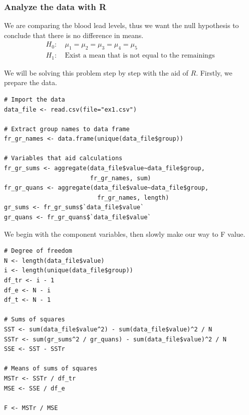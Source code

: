 \documentclass[a4paper]{article}
\numberwithin{equation}{section}
\begin{document}
\subsubsection{Analyze the data with R}
We are comparing the blood lead levels, thus we want the null hypothesis to conclude that there is no difference in means.
\begin{align*}
  H_0: & \ \mu_1 = \mu_2 = \mu_3 = \mu_4 = \mu_5                   \\
  H_1: & \ \text{Exist a mean that is not equal to the remainings}
\end{align*}

We will be solving this problem step by step with the aid of \(R\).
Firstly, we prepare the data.
\begin{mdframed}[leftline=false,rightline=false,backgroundcolor=magenta!10,nobreak=true]
  \begin{verbatim}
# Import the data
data_file <- read.csv(file="ex1.csv")

# Extract group names to data frame
fr_gr_names <- data.frame(unique(data_file$group))

# Variables that aid calculations
fr_gr_sums <- aggregate(data_file$value~data_file$group,
                        fr_gr_names, sum)
fr_gr_quans <- aggregate(data_file$value~data_file$group,
                          fr_gr_names, length)
gr_sums <- fr_gr_sums$`data_file$value`
gr_quans <- fr_gr_quans$`data_file$value`
  \end{verbatim}
\end{mdframed}

We begin with the component variables, then slowly make our way to F value.
\begin{mdframed}[leftline=false,rightline=false,backgroundcolor=magenta!10,nobreak=true]
  \begin{verbatim}
# Degree of freedom
N <- length(data_file$value)
i <- length(unique(data_file$group))
df_tr <- i - 1
df_e <- N - i
df_t <- N - 1

# Sums of squares
SST <- sum(data_file$value^2) - sum(data_file$value)^2 / N
SSTr <- sum(gr_sums^2 / gr_quans) - sum(data_file$value)^2 / N
SSE <- SST - SSTr

# Means of sums of squares
MSTr <- SSTr / df_tr
MSE <- SSE / df_e

F <- MSTr / MSE
  \end{verbatim}
\end{mdframed}
\end{document}
